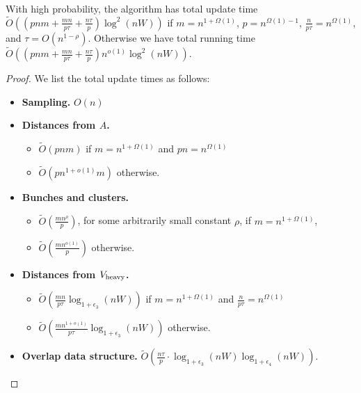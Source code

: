 \begin{lemma}\label{lm:mult_2W_time}
    With high probability, the algorithm \DynAPSPtwoW has total update time $ \tilde O ((pnm + \tfrac{m n }{p\tau}+\tfrac{n\tau}{ p})\log^2(nW)) $ if $m=n^{1+\Omega(1)}$, $p=n^{\Omega(1)-1}$, $\tfrac{n}{p\tau}=n^{\Omega(1)}$, and $\tau = O(n^{1-\rho})$. Otherwise we have total running time $ \tilde O ((pnm +\tfrac{m n }{p\tau} +\tfrac{n\tau}{ p})n^{o(1)}\log^2(nW)) $.
\end{lemma}
\begin{proof}
    We list the total update times as follows:
\begin{itemize}
    \item \textbf{Sampling.} $O(n)$
    \item \textbf{Distances from $A$.}
    \begin{itemize}
	\item $\tilde{O}(pnm)$ if $m=n^{1+\Omega(1)}$ and $pn=n^{\Omega(1)}$
	\item $\tilde O(pn^{1+o(1)}m)$ otherwise.
    \end{itemize}
    \item \textbf{Bunches and clusters.} 
    \begin{itemize}
	\item $ \tilde O (\tfrac{mn^\rho}{p}) $, for some arbitrarily small constant $\rho$, if $m=n^{1+\Omega(1)}$, 
	\item $\tilde O(\tfrac{mn^{o(1)}}{p})$ otherwise.
    \end{itemize}
    \item \textbf{Distances from $ V_{\rm{heavy}} $.}
    \begin{itemize}
	\item $ \tilde O (\tfrac{m n }{p\tau}\log_{1+\epsilon_3}(nW)) $ if $m=n^{1+\Omega(1)}$ and $\tfrac{n}{p\tau}=n^{\Omega(1)}$
	\item $ \tilde O (\tfrac{m n^{1+o(1)} }{p\tau}\log_{1+\epsilon_3}(nW)) $ otherwise.
    \end{itemize}
   \item \textbf{Overlap data structure.} $\tilde O (\tfrac{n\tau }{p} \cdot\log_{1+\epsilon_3}(nW)\log_{1+\epsilon_4}(nW)) $.
\end{itemize}


\end{proof}
